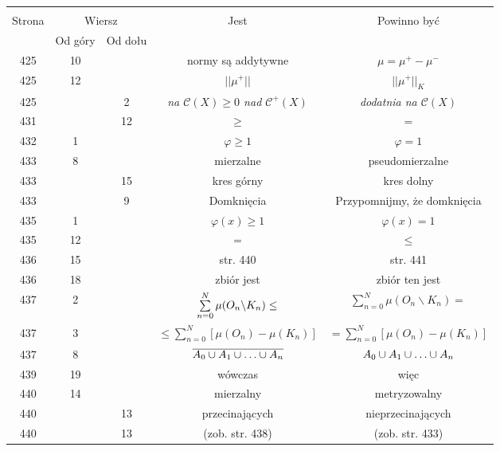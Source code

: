 \documentclass[a4paper,11pt]{article}
\begin{document}
\begin{center}
  \begin{tabular}{|c|c|c|c|c|}
    \hline
    & \multicolumn{2}{c|}{} & & \\
    Strona & \multicolumn{2}{c|}{Wiersz} & Jest
                              & Powinno być \\ \cline{2-3}
    & Od góry & Od dołu & & \\
    \hline
    425 & 10 & & normy są addytywne & $\mu = \mu^{ + } - \mu^{ - }$ \\
    425 & 12 & & $|| \mu^{ + } ||$ & $|| \mu^{ + } ||_{ K }$ \\
    425 & &  2 & \emph{na $\mathcal{C}( X ) \geq 0$ nad
                 $\mathcal{C}^{ + }( X )$} 
           & \emph{dodatnia na $\mathcal{C}( X )$} \\
    431 & & 12 & $\geq$ & $=$ \\
    432 &  1 & & $\varphi \geq 1$ & $\varphi = 1$ \\
    433 &  8 & & mierzalne & pseudomierzalne \\
    433 & & 15 & kres górny & kres dolny \\
    433 & &  9 & Domknięcia & Przypomnijmy, że domknięcia \\
    435 &  1 & & $\varphi( x ) \geq 1$ & $\varphi( x ) = 1$ \\
    435 & 12 & & $=$ & $\leq$ \\
    436 & 15 & & str. 440 & str. 441 \\
    436 & 18 & & zbiór jest & zbiór ten jest \\
    437 &  2 & & $\sum\limits^{ N }_{ n = 0 } \mu( O_{ n } \backslash
                 K_{ n } ) \leq$ & $\sum\limits^{ N }_{ n = 0 }
                                   \mu( O_{ n } \backslash K_{ n } ) =$ \\
    437 &  3 & & $\leq \sum\limits^{ N }_{ n = 0 } [ \mu( O_{ n } )
                 - \mu( K_{ n } ) ]$ 
           & $= \sum\limits^{ N }_{ n = 0 } [ \mu( O_{ n } ) 
             - \mu( K_{ n } ) ]$ \\
    437 &  8 & & $\overline{ A_{ 0 } \cup A_{ 1 } \cup \ldots \cup A_{ n } }$
           & $A_{ 0 } \cup A_{ 1 } \cup \ldots \cup A_{ n }$ \\
    439 & 19 & & wówczas & więc \\
    440 & 14 & & mierzalny & metryzowalny \\
    440 & & 13 & przecinających & nieprzecinających \\
    440 & & 13 & (zob. str. 438) & (zob. str. 433) \\

\end{tabular}
\end{center}
\end{document}
